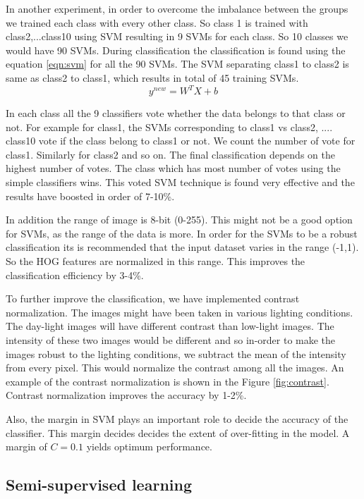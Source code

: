 \documentclass{article} %
\begin{document}
	In another experiment, in order to overcome the imbalance between the groups we trained each class with every other class. So class 1 is trained with class2,...class10 using SVM resulting in 9 SVMs for each class. So 10 classes we would have 90 SVMs. During classification the classification is found using the equation \ref{eqn:svm} for all the 90 SVMs. The SVM separating class1 to class2 is same as class2 to class1, which results in total of 45 training SVMs.
	\begin{equation}
	\label{eqn:svm}
		y^{new} = W^T X + b	
	\end{equation}
	
In each class all the 9 classifiers vote whether the data belongs to that class or not. For example for class1, the SVMs corresponding to class1 vs class2, .... class10 vote if the class belong to class1 or not. We count the number of vote for class1. Similarly for class2 and so on. The final classification depends on the highest number of votes. The class which has most number of votes using the simple classifiers wins. This voted SVM technique is found very effective and the results have boosted in order of 7-10\%.

In addition the range of image is 8-bit (0-255). This might not be a good option for SVMs, as the range of the data is more. In order for the SVMs to be a robust classification its is recommended that the input dataset varies in the range (-1,1). So the HOG features are normalized in this range. This improves the classification efficiency by 3-4\%.

To further improve the classification, we have implemented contrast normalization. The images might have been taken in various lighting conditions. The day-light images will have different contrast than low-light images. The intensity of these two images would be different and so in-order to make the images robust to the lighting conditions, we subtract the mean of the intensity from every pixel. This would normalize the contrast among all the images. An example of the contrast normalization is shown in the Figure \ref{fig:contrast}. Contrast normalization improves the accuracy by 1-2\%.

Also, the margin in SVM plays an important role to decide the accuracy of the classifier. This margin decides decides the extent of over-fitting in the model. A margin of $C=0.1$ yields optimum performance.

\subsection{Semi-supervised learning}
\end{document}
